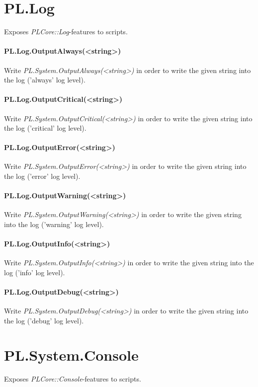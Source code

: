 \section{PL.Log}
Exposes \emph{PLCore::Log}-features to scripts.

\paragraph{PL.Log.OutputAlways(<string>)}
Write \emph{PL.System.OutputAlways(<string>)} in order to write the given string into the log ('always' log level).

\paragraph{PL.Log.OutputCritical(<string>)}
Write \emph{PL.System.OutputCritical(<string>)} in order to write the given string into the log ('critical' log level).

\paragraph{PL.Log.OutputError(<string>)}
Write \emph{PL.System.OutputError(<string>)} in order to write the given string into the log ('error' log level).

\paragraph{PL.Log.OutputWarning(<string>)}
Write \emph{PL.System.OutputWarning(<string>)} in order to write the given string into the log ('warning' log level).

\paragraph{PL.Log.OutputInfo(<string>)}
Write \emph{PL.System.OutputInfo(<string>)} in order to write the given string into the log ('info' log level).

\paragraph{PL.Log.OutputDebug(<string>)}
Write \emph{PL.System.OutputDebug(<string>)} in order to write the given string into the log ('debug' log level).




\section{PL.System.Console}
Exposes \emph{PLCore::Console}-features to scripts.

